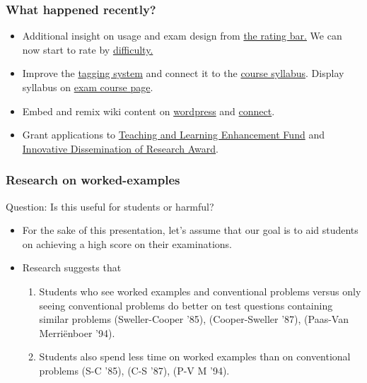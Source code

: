 \documentclass{beamer}
\begin{document}
\frame
{
  \frametitle{What happened recently?}

      \begin{itemize}
            \item Additional insight on usage and exam design from  \href{http://wiki.ubc.ca/Science:Math_Exam_Resources/Courses/MATH105/April_2010/Question_6}{the rating bar.} We can now start to rate by \href{http://wiki.ubc.ca/Sandbox:MER-rating}{difficulty.}
            \item Improve the \href{http://wiki.ubc.ca/Category:MER_Tag_Linear_approximation}{tagging system} and connect it to the  \href{http://www.math.ubc.ca/~cbruni/pdfs/Math103JanApr2014/syllabus.pdf}{course syllabus}. Display syllabus on \href{http://wiki.ubc.ca/Science:Math_Exam_Resources/Courses/MATH103}{exam course page}.
            \item Embed and remix wiki content on \href{http://wordpress.org/plugins/wiki-embed/}{wordpress} and \href{http://wiki.ubc.ca/Sandbox:MER_Wiki_to_LMS}{connect}.
            \item Grant applications to \href{http://tlef.ubc.ca/tlef-criteria/}{Teaching and Learning Enhancement Fund} and \href{http://wiki.ubc.ca/Library:Scholarly_Communications/Innovative_Dissemination_of_Research_Award}{Innovative Dissemination of Research Award}.

\end{itemize}
}




\frame
{
  \frametitle{Research on worked-examples}

\alert{Question:} Is this useful for students or harmful?\\

      \begin{itemize}
            \item For the sake of this presentation, let's assume that our goal is to aid students on achieving a high score on their examinations.
            \item Research suggests that
            \begin{enumerate}
            \item Students who see worked examples and conventional problems versus only seeing conventional problems do better on test questions containing similar problems (Sweller-Cooper '85), (Cooper-Sweller '87), (Paas-Van Merri\"enboer '94).
            \item Students also spend less time on worked examples than on conventional problems (S-C '85), (C-S '87), (P-V M '94).
            \end{enumerate}
      \end{itemize}
}
\end{document}
